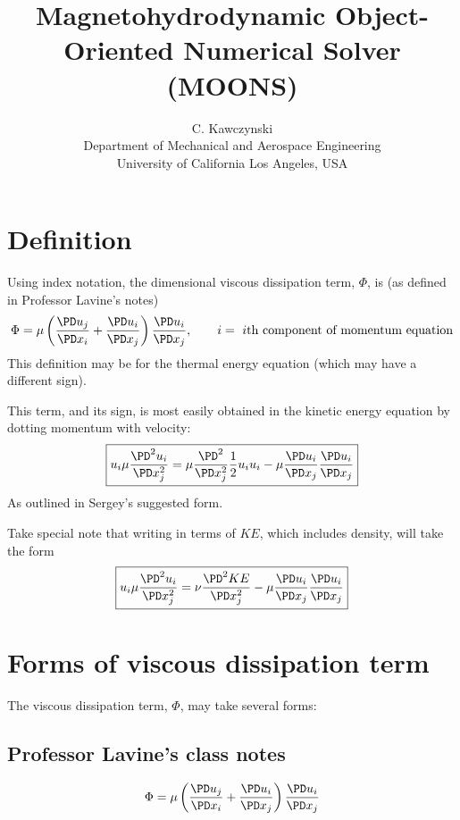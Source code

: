\documentclass[11pt]{article}
\begin{document}
\doublespacing
\title{Magnetohydrodynamic Object-Oriented Numerical Solver (MOONS)}
\author{C. Kawczynski \\
Department of Mechanical and Aerospace Engineering \\
University of California Los Angeles, USA\\
}
\maketitle

\section{Definition}
Using index notation, the dimensional viscous dissipation term, $\Phi$, is (as defined in Professor Lavine's notes)
\begin{equation}
\Phi=\mu \left( \frac{\PD u_j}{\PD x_i}+\frac{\PD u_i}{\PD x_j} \right) \frac{\PD u_i}{\PD x_j}, \qquad i=\text{ $i$th component of momentum equation}
\end{equation}
This definition may be for the thermal energy equation (which may have a different sign).

This term, and its sign, is most easily obtained in the kinetic energy equation by dotting momentum with velocity:
\begin{equation}
	\boxed{
	u_i \mu \frac{\PD^2 u_i}{\PD x_j^2} =
	\mu \frac{\PD^2}{\PD x_j^2} \frac{1}{2} u_i u_i -
	\mu \frac{\PD u_i}{\PD x_j}\frac{\PD u_i}{\PD x_j}
	}
\end{equation}
As outlined in Sergey's suggested form.

Take special note that writing in terms of $KE$, which includes density, will take the form
\begin{equation}
	\boxed{
	u_i \mu \frac{\PD^2 u_i}{\PD x_j^2} =
	\nu \frac{\PD^2 KE}{\PD x_j^2} -
	\mu \frac{\PD u_i}{\PD x_j}\frac{\PD u_i}{\PD x_j}
	}
\end{equation}

\section{Forms of viscous dissipation term}
The viscous dissipation term, $\Phi$, may take several forms:

\subsection{Professor Lavine's class notes}
\begin{equation}
\Phi=\mu \left( \frac{\PD u_j}{\PD x_i}+\frac{\PD u_i}{\PD x_j} \right) \frac{\PD u_i}{\PD x_j}
\end{equation}
\end{document}
